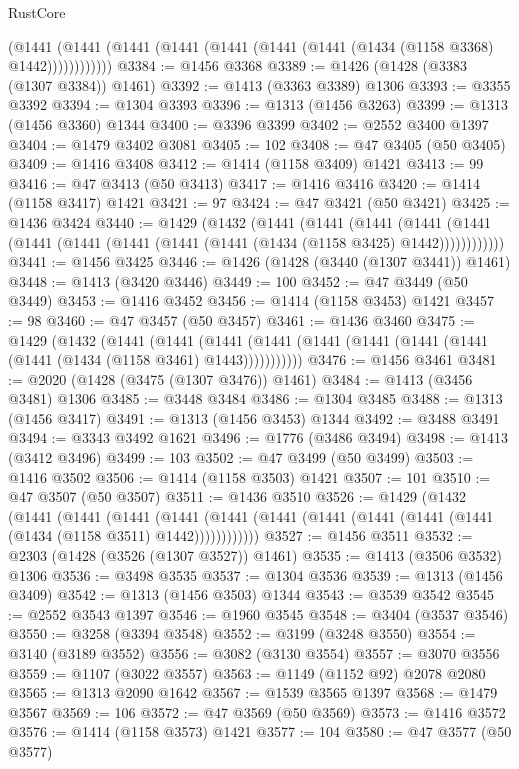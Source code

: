 \begin{lexlean}{RustCore}
\begin{coremodule}
            (@1441 (@1441 (@1441 (@1441 (@1441 (@1441 (@1441 (@1434 (@1158 @3368) @1442))))))))))))
@3384 := @1456 @3368
@3389 := @1426 (@1428 (@3383 (@1307 @3384)) @1461)
@3392 := @1413 (@3363 @3389) @1306
@3393 := @3355 @3392
@3394 := @1304 @3393
@3396 := @1313 (@1456 @3263)
@3399 := @1313 (@1456 @3360) @1344
@3400 := @3396 @3399
@3402 := @2552 @3400 @1397
@3404 := @1479 @3402 @3081
@3405 := 102
@3408 := @47 @3405 (@50 @3405)
@3409 := @1416 @3408
@3412 := @1414 (@1158 @3409) @1421
@3413 := 99
@3416 := @47 @3413 (@50 @3413)
@3417 := @1416 @3416
@3420 := @1414 (@1158 @3417) @1421
@3421 := 97
@3424 := @47 @3421 (@50 @3421)
@3425 := @1436 @3424
@3440 := @1429
    (@1432
      (@1441
        (@1441
          (@1441
            (@1441 (@1441 (@1441 (@1441 (@1441 (@1441 (@1441 (@1434 (@1158 @3425) @1442))))))))))))
@3441 := @1456 @3425
@3446 := @1426 (@1428 (@3440 (@1307 @3441)) @1461)
@3448 := @1413 (@3420 @3446)
@3449 := 100
@3452 := @47 @3449 (@50 @3449)
@3453 := @1416 @3452
@3456 := @1414 (@1158 @3453) @1421
@3457 := 98
@3460 := @47 @3457 (@50 @3457)
@3461 := @1436 @3460
@3475 := @1429
    (@1432
      (@1441
        (@1441
          (@1441 (@1441 (@1441 (@1441 (@1441 (@1441 (@1441 (@1434 (@1158 @3461) @1443)))))))))))
@3476 := @1456 @3461
@3481 := @2020 (@1428 (@3475 (@1307 @3476)) @1461)
@3484 := @1413 (@3456 @3481) @1306
@3485 := @3448 @3484
@3486 := @1304 @3485
@3488 := @1313 (@1456 @3417)
@3491 := @1313 (@1456 @3453) @1344
@3492 := @3488 @3491
@3494 := @3343 @3492 @1621
@3496 := @1776 (@3486 @3494)
@3498 := @1413 (@3412 @3496)
@3499 := 103
@3502 := @47 @3499 (@50 @3499)
@3503 := @1416 @3502
@3506 := @1414 (@1158 @3503) @1421
@3507 := 101
@3510 := @47 @3507 (@50 @3507)
@3511 := @1436 @3510
@3526 := @1429
    (@1432
      (@1441
        (@1441
          (@1441
            (@1441 (@1441 (@1441 (@1441 (@1441 (@1441 (@1441 (@1434 (@1158 @3511) @1442))))))))))))
@3527 := @1456 @3511
@3532 := @2303 (@1428 (@3526 (@1307 @3527)) @1461)
@3535 := @1413 (@3506 @3532) @1306
@3536 := @3498 @3535
@3537 := @1304 @3536
@3539 := @1313 (@1456 @3409)
@3542 := @1313 (@1456 @3503) @1344
@3543 := @3539 @3542
@3545 := @2552 @3543 @1397
@3546 := @1960 @3545
@3548 := @3404 (@3537 @3546)
@3550 := @3258 (@3394 @3548)
@3552 := @3199 (@3248 @3550)
@3554 := @3140 (@3189 @3552)
@3556 := @3082 (@3130 @3554)
@3557 := @3070 @3556
@3559 := @1107 (@3022 @3557)
@3563 := @1149 (@1152 @92) @2078 @2080
@3565 := @1313 @2090 @1642
@3567 := @1539 @3565 @1397
@3568 := @1479 @3567
@3569 := 106
@3572 := @47 @3569 (@50 @3569)
@3573 := @1416 @3572
@3576 := @1414 (@1158 @3573) @1421
@3577 := 104
@3580 := @47 @3577 (@50 @3577)

\end{coremodule}
\end{lexlean}
